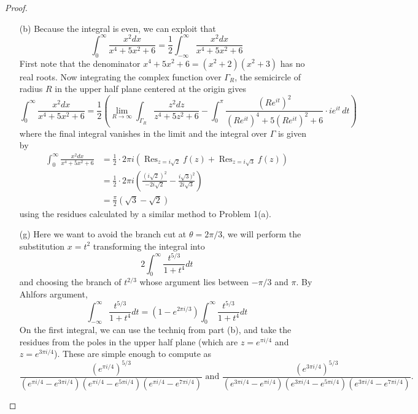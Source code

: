 \documentclass{article}
\begin{document}
\begin{proof} \text{} \\
  \begin{enumerate}
    \item[(b)]
      Because the integral is even, we can exploit that \[
        \int_0^\infty \frac{x^2 dx}{x^4 + 5x^2 + 6}
        = \frac{1}{2}\int_{-\infty}^\infty \frac{x^2 dx}{x^4 + 5x^2 + 6}
      \]
      First note that the denominator $x^4 + 5x^2 + 6 = (x^2 + 2)(x^2 + 3)$ has
      no real roots. Now integrating the complex function over $\Gamma_R$, the
      semicircle of radius $R$ in the upper half plane centered at the origin
      gives \[
        \int_0^\infty \frac{x^2 dx}{x^4 + 5x^2 + 6}
          = \frac{1}{2}\left(
            \lim_{R \rightarrow \infty} \int_{\Gamma_R} \frac{z^2 dz}{z^4 + 5z^2 + 6}
            - \int_0^\pi \frac{(Re^{it})^2}{(Re^{it})^4 + 5(Re^{it})^2 + 6}\cdot ie^{it}\,dt
          \right)
      \] where the final integral vanishes in the limit and the integral over
      $\Gamma$ is given by \begin{align*}
        \int_0^\infty \frac{x^2 dx}{x^4 + 5x^2 + 6}
        &= \frac{1}{2}\cdot2\pi i(\operatorname{Res}_{z=i\sqrt{2}}f(z) + \operatorname{Res}_{z=i\sqrt{3}}f(z))\\
        &= \frac{1}{2}\cdot2\pi i\left(\frac{(i\sqrt{2})^2}{-2i\sqrt{2}} - \frac{i\sqrt{3})^2}{2i\sqrt{3}}\right)\\
        &= \frac{\pi}{2}\left(\sqrt{3} - \sqrt{2}\right)
      \end{align*} using the residues calculated by a similar method to Problem 1(a).
    \item[(g)]
      Here we want to avoid the branch cut at $\theta = 2\pi/3$, we will perform
      the substitution $x = t^2$ transforming the integral into \[
        2\int_0^\infty \frac{t^{5/3}}{1 + t^4} dt
      \] and choosing the branch of $t^{2/3}$ whose argument lies between
      $-\pi/3$ and $\pi$. By Ahlfors argument, \[
        \int_{-\infty}^\infty \frac{t^{5/3}}{1 + t^4} dt = (1 - e^{2\pi i/3}) \int_0^\infty \frac{t^{5/3}}{1 + t^4} dt
      \] On the first integral, we can use the techniq from part (b), and
      take the residues from the poles in the upper half plane
      (which are $z = e^{\pi i/4}$ and $z = e^{3\pi i/4}$).
      These are simple enough to compute as \[
        \frac{(e^{\pi i/4})^{5/3}}{(e^{\pi i/4} - e^{3\pi i/4})(e^{\pi i/4} - e^{5\pi i/4})(e^{\pi i/4} - e^{7\pi i/4})}
        \text{ and }
        \frac{(e^{3\pi i/4})^{5/3}}{(e^{3\pi i/4} - e^{\pi i/4})(e^{3\pi i/4} - e^{5\pi i/4})(e^{3\pi i/4} - e^{7\pi i/4})}.
\]
\end{enumerate}
\end{proof}
\end{document}
